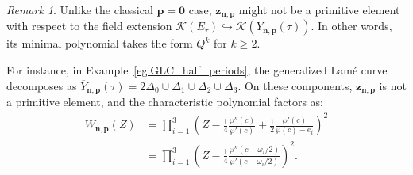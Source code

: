 \documentclass[11pt]{amsart}
\theoremstyle{remark}
\newtheorem{remark}[theorem]{Remark}
\numberwithin{equation}{section}
\begin{document}
\begin{remark}
Unlike the classical $\mathbf{p}=\mathbf{0}$ case, $\mathbf{z}_{\mathbf{n},\mathbf{p}}$ might not be a primitive element with respect to the field extension $\mathcal{K}(E_\tau) \hookrightarrow \mathcal{K}(\overline{Y}_{\mathbf{n},\mathbf{p}}(\tau))$. In other words, its minimal polynomial takes the form $Q^k$ for $k\geq 2$. 

For instance, in Example~\ref{eg:GLC_half_periods}, the generalized Lam\'e curve decomposes as $\overline{Y}_{\mathbf{n},\mathbf{p}}(\tau) = 2\Delta_0 \cup \Delta_1 \cup \Delta_2 \cup \Delta_3$. On these components, $\mathbf{z}_{\mathbf{n},\mathbf{p}}$ is not a primitive element, and the characteristic polynomial factors as:
\[
\begin{split}
    W_{\mathbf{n},\mathbf{p}}(Z) &= \prod_{i=1}^3 \left( Z - \frac{1}{4} \frac{\wp''(c)}{\wp'(c)} + \frac{1}{2} \frac{\wp'(c)}{\wp(c) - e_i} \right)^2
    \\
    & = \prod_{i=1}^3 \left( Z - \frac{1}{4} \frac{\wp''(c - \omega_i/2)}{\wp'(c - \omega_i/2)} \right)^2.
\end{split}
\]
\end{remark}
\end{document}
